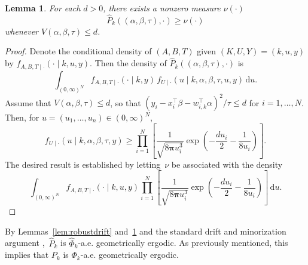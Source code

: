 \documentclass[12pt]{article}
\newcommand{\df}{\mathrm{d}}
\newtheorem{lemma}[theorem]{Lemma}
\begin{document}
	\begin{lemma} \label{lem:robustminor}
		For each $d > 0$, there exists a nonzero measure $\nu(\cdot)$
		\[
		\hat{P}_k((\alpha, \beta, \tau), \cdot) \geq \nu(\cdot)
		\]
		whenever $V(\alpha, \beta, \tau) \leq d$.
	\end{lemma}
	\begin{proof}
		Denote the conditional density of $(A,B,T)$ given $(K,U,Y) = (k,u,y)$ by $f_{A,B,T \mid \cdot}(\cdot \mid k,u,y)$.
		Then the density of $\hat{P}_k((\alpha,\beta,\tau), \cdot)$ is
		\[
		\int_{(0,\infty)^N} f_{A,B,T \mid \cdot}(\cdot \mid k,y) \, f_{U \mid \cdot}(u \mid k, \alpha, \beta, \tau, u, y) \, \df u.
		\]
		Assume that $V(\alpha, \beta, \tau) \leq d$, so that $(y_i - x_i^{\top} \beta - w_{i,k}^{\top} \alpha)^2/\tau \leq d$ for $i = 1,\dots,N$.
		Then, for $u = (u_1, \dots, u_n) \in (0,\infty)^N$,
		\[
		f_{U \mid \cdot}(u \mid k, \alpha, \beta, \tau, y) \geq \prod_{i=1}^N \left[ \frac{1}{\sqrt{8\bm{\pi} u_i^3}} \exp \left( - \frac{du_i}{2} - \frac{1}{8 u_i}  \right) \right].
		\]
		The desired result is established by letting~$\nu$ be associated with the density
		\[
		\int_{(0,\infty)^N} f_{A,B,T \mid \cdot}(\cdot \mid k,u,y) \prod_{i=1}^N \left[ \frac{1}{\sqrt{8\bm{\pi} u_i^3}} \exp \left( - \frac{du_i}{2} - \frac{1}{8 u_i}  \right) \right] \, \df u.
		\]
	\end{proof}
	
	By Lemmas~\ref{lem:robustdrift} and~\ref{lem:robustminor} and the standard drift and minorization argument \citep{rosenthal1995minorization},~$\hat{P}_k$ is $\hat{\Phi}_k$-a.e. geometrically ergodic.
	As previously mentioned, this implies that $P_k$ is $\Phi_k$-a.e. geometrically ergodic.
	
	
	
	
	
	
\end{document}
